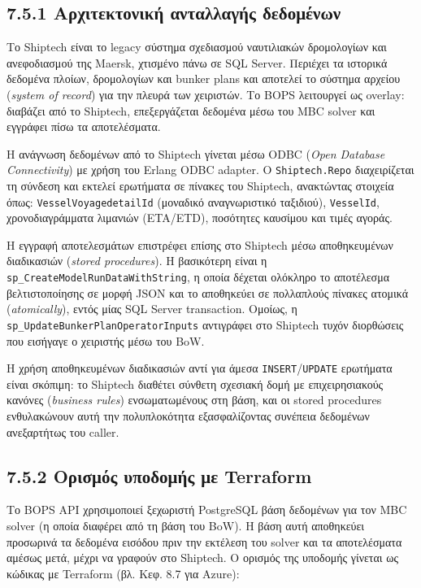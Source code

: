 \subsection{7.5.1 Αρχιτεκτονική ανταλλαγής
δεδομένων}\label{ux3b1ux3c1ux3c7ux3b9ux3c4ux3b5ux3baux3c4ux3bfux3bdux3b9ux3baux3ae-ux3b1ux3bdux3c4ux3b1ux3bbux3bbux3b1ux3b3ux3aeux3c2-ux3b4ux3b5ux3b4ux3bfux3bcux3adux3bdux3c9ux3bd}

Το Shiptech είναι το legacy σύστημα σχεδιασμού ναυτιλιακών δρομολογίων
και ανεφοδιασμού της Maersk, χτισμένο πάνω σε SQL Server. Περιέχει τα
ιστορικά δεδομένα πλοίων, δρομολογίων και bunker plans και αποτελεί το
σύστημα αρχείου (\emph{system of record}) για την πλευρά των χειριστών.
Το BOPS λειτουργεί ως overlay: διαβάζει από το Shiptech, επεξεργάζεται
δεδομένα μέσω του MBC solver και εγγράφει πίσω τα αποτελέσματα.

Η ανάγνωση δεδομένων από το Shiptech γίνεται μέσω ODBC (\emph{Open
Database Connectivity}) με χρήση του Erlang ODBC adapter. Ο
\texttt{Shiptech.Repo} διαχειρίζεται τη σύνδεση και εκτελεί ερωτήματα σε
πίνακες του Shiptech, ανακτώντας στοιχεία όπως:
\texttt{VesselVoyagedetailId} (μοναδικό αναγνωριστικό ταξιδιού),
\texttt{VesselId}, χρονοδιαγράμματα λιμανιών (ETA/ETD), ποσότητες
καυσίμου και τιμές αγοράς.

Η εγγραφή αποτελεσμάτων επιστρέφει επίσης στο Shiptech μέσω
αποθηκευμένων διαδικασιών (\emph{stored procedures}). Η βασικότερη είναι
η \texttt{sp\_CreateModelRunDataWithString}, η οποία δέχεται ολόκληρο το
αποτέλεσμα βελτιστοποίησης σε μορφή JSON και το αποθηκεύει σε πολλαπλούς
πίνακες ατομικά (\emph{atomically}), εντός μίας SQL Server transaction.
Ομοίως, η \texttt{sp\_UpdateBunkerPlanOperatorInputs} αντιγράφει στο
Shiptech τυχόν διορθώσεις που εισήγαγε ο χειριστής μέσω του BoW.

Η χρήση αποθηκευμένων διαδικασιών αντί για άμεσα
\texttt{INSERT}/\texttt{UPDATE} ερωτήματα είναι σκόπιμη: το Shiptech
διαθέτει σύνθετη σχεσιακή δομή με επιχειρησιακούς κανόνες
(\emph{business rules}) ενσωματωμένους στη βάση, και οι stored
procedures ενθυλακώνουν αυτή την πολυπλοκότητα εξασφαλίζοντας συνέπεια
δεδομένων ανεξαρτήτως του caller.

\subsection{7.5.2 Ορισμός υποδομής με
Terraform}\label{ux3bfux3c1ux3b9ux3c3ux3bcux3ccux3c2-ux3c5ux3c0ux3bfux3b4ux3bfux3bcux3aeux3c2-ux3bcux3b5-terraform}

Το BOPS API χρησιμοποιεί ξεχωριστή PostgreSQL βάση δεδομένων για τον MBC
solver (η οποία διαφέρει από τη βάση του BoW). Η βάση αυτή αποθηκεύει
προσωρινά τα δεδομένα εισόδου πριν την εκτέλεση του solver και τα
αποτελέσματα αμέσως μετά, μέχρι να γραφούν στο Shiptech. Ο ορισμός της
υποδομής γίνεται ως κώδικας με Terraform (βλ. Κεφ. 8.7 για Azure):

